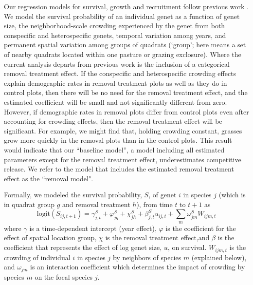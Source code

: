 \documentclass[11pt]{article}
\begin{document}
\begin{doublespacing}
Our regression models for survival, growth and recruitment follow previous work \citep{adler_coexistence_2010,chu_large_2015}. We model the survival probability of an individual genet as a function of genet size, the neighborhood-scale crowding experienced by the genet from both conspecific and heterospecific genets, temporal variation among years, and permanent spatial variation among groups of quadrats (`group'; here means a set of nearby quadrats located within one pasture or grazing exclosure). Where the current analysis departs from previous work is the inclusion of a categorical removal treatment effect. If the conspecific and heterospecific crowding effects explain demographic rates in removal treatment plots as well as they do in control plots, then there will be no need for the removal treatment effect, and the estimated coefficient will be small and not significantly different from zero. However, if demographic rates in removal plots differ from control plots even after accounting for crowding effects, then the removal treatment effect will be significant. For example, we might find that, holding crowding constant, grasses grow more quickly in the removal plots than in the control plots. This result would indicate that our ``baseline model'', a model including all estimated parameters except for the removal treatment effect, underestimates competitive release. We refer to the model that includes the estimated removal treatment effect as the ``removal model". 

Formally, we modeled the survival probability, $S$, of genet $i$ in species $j$ (which is in quadrat group $g$ and removal treatment $h$), 
from time $t$ to $t+1$  as
\begin{equation}
\mbox{logit}(S_{ij,t+1}) = \gamma_{j,t}^S + \varphi_{jg}^S+  \chi_{jh}^S  + \beta_{j,t}^S u_{ij,t} +  
\sum \limits_{m} \omega_{jm}^S {W}_{ijm,t}
\label{eqn:survReg}
\end{equation}
where $\gamma$ is a time-dependent intercept (year effect), $\varphi$ is the coefficient for the 
effect of spatial location group, $\chi$ is the removal treatment effect,and  $\beta$ is the coefficient that 
represents the effect of log genet size, $u$, on survival. 
$W_{ijm,t}$ is the crowding of individual $i$ in species $j$ by neighbors of species $m$ (explained below), and 
$\omega_{jm}$ is an interaction coefficient which determines the impact of crowding by species $m$ on the focal species $j$. 


\end{doublespacing}
\end{document}
